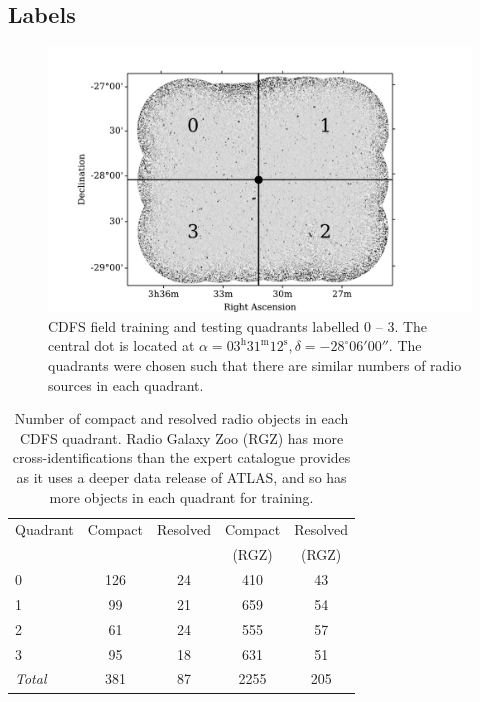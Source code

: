 \documentclass[fleqn,usenatbib,usedcolumn]{mnras}
\begin{document}
  \subsection{Labels}\label{sec:labels}
    \begin{figure}
      \centering
      \includegraphics[width=\columnwidth]{images/quadrants.pdf}
      \caption{CDFS field training and testing quadrants labelled 0 -- 3. The
        central dot is located at $\alpha = 03^\text{h}31^\text{m}12^\text{s},
        \delta = -28^\circ{}06'00''$. The quadrants were chosen such that
        there are similar numbers of radio sources in each
        quadrant.\label{fig:quadrants}}
    \end{figure}

    \begin{table}
      \caption{Number of compact and resolved radio objects in each CDFS quadrant. Radio Galaxy Zoo (RGZ) has more cross-identifications than the expert catalogue provides as it uses a deeper data release of ATLAS, and so has more objects in each quadrant for training.}
      \label{tab:radio-count}
      \begin{tabular}{lcccc}
        \hline
        Quadrant & Compact & Resolved & Compact & Resolved\\
        &&&(RGZ)&(RGZ)\\
        \hline
        0 & 126 & 24 & 410 & 43 \\
        1 & 99 & 21 & 659 & 54 \\
        2 & 61 & 24 & 555 & 57 \\
        3 & 95 & 18 & 631 & 51 \\
        \hline
        \textit{Total} & 381 & 87 & 2255 & 205\\
        \hline
      \end{tabular}
    \end{table}
\end{document}

